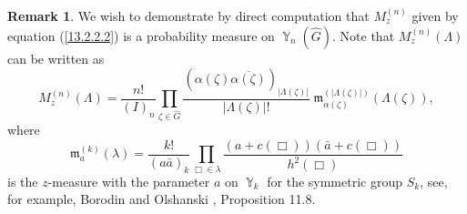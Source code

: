 \documentclass[12pt]{amsart}
\theoremstyle{definition}
\newtheorem{rem}[thm]{Remark}
\numberwithin{equation}{section}
\DeclareMathOperator{\Y}{\mathbb{Y}}
\begin{document}
\begin{rem}
We wish to demonstrate by direct computation that $M_z^{(n)}$ given by equation
(\ref{13.2.2.2}) is a probability measure on $\Y_n(\widehat{G})$.
Note that $M_z^{(n)}(\Lambda)$ can be written as
\begin{equation}\label{6.2.1}
M_z^{(n)}\left(\Lambda\right)=\frac{n!}{(I)_n}\prod\limits_{\zeta\in\widehat{G}}
\frac{\left(\alpha(\zeta)
\overline{\alpha(\zeta)}\right)_{|\Lambda(\zeta)|}}{|\Lambda(\zeta)|!}\;
\mathfrak{m}_{\alpha(\zeta)}^{\left(|\Lambda(\zeta)|\right)}
\left(\Lambda(\zeta)\right),
\end{equation}
where
\begin{equation}\label{6.2.2}
\mathfrak{m}_{a}^{(k)}(\lambda)=\frac{k!}{(a\bar{a})_k}\prod\limits_{\Box\in\lambda}
\frac{(a+c(\Box))(\bar{a}+c(\Box))}{h^2(\Box)}
\end{equation}
is the $z$-measure with the parameter $a$ on $\Y_k$  for the symmetric group $S_k$, see, for example, Borodin and Olshanski \cite{BorodinOlshanskiBook}, Proposition 11.8.


\end{rem}
\end{document}
